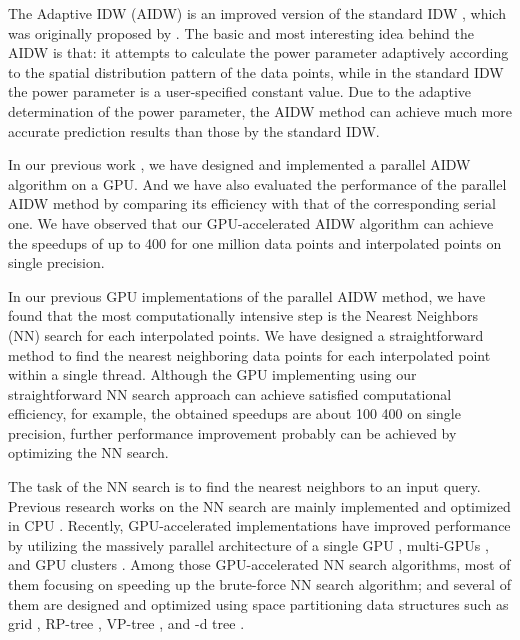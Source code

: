 \documentclass[final,5p,times,twocolumn,authoryear]{elsarticle}
\begin{document}
The Adaptive IDW (AIDW) is an improved version of the standard IDW \citep{01Shepard:1968:TIF:800186.810616}, which was originally proposed by \cite{28DBLP:journals/gandc/LuW08}. 
The basic and most interesting idea behind the AIDW is that: it attempts to 
calculate the power parameter adaptively according to the spatial 
distribution pattern of the data points, while in the standard IDW the power 
parameter is a user-specified constant value. Due to the adaptive 
determination of the power parameter, the AIDW method can achieve much more 
accurate prediction results than those by the standard IDW. 

In our previous work \citep{29DBLP:journals/corr/MeiXX15}, we have designed and implemented a parallel AIDW 
algorithm on a GPU. And we have also evaluated the performance of the 
parallel AIDW method by comparing its efficiency with that of the 
corresponding serial one. We have observed that our GPU-accelerated AIDW 
algorithm can achieve the speedups of up to 400 for one million data points 
and interpolated points on single precision.

In our previous GPU implementations of the parallel AIDW method, we have 
found that the most computationally intensive step is the  Nearest Neighbors 
(NN) search for each interpolated points. We have designed a straightforward 
method to find the  nearest neighboring data points for each interpolated 
point within a single thread. Although the GPU implementing using our 
straightforward NN search approach can achieve satisfied computational 
efficiency, for example, the obtained speedups are about 100  400 on 
single precision, further performance improvement probably can be achieved by 
optimizing the NN search. 

The task of the NN search is to find the nearest neighbors to an input 
query. Previous research works on the NN search are mainly implemented and 
optimized in CPU \citep{n01DBLP:journals/cg/SankaranarayananSV07}. Recently, GPU-accelerated implementations 
have improved performance by utilizing the massively parallel architecture 
of a single GPU \citep{n02DBLP:conf/cvpr/GarciaDB08,n03DBLP:journals/ijpp/LeiteTFRTK12,n04DBLP:conf/icde/PanM12,n05Liang5382329,06DBLP:journals/gandc/HuangY11, n07DBLP:journals/prl/BeliakovL12, n08DBLP:journals/corr/KomarovDD13, n09DBLP:journals/prl/LiuW15}, multi-GPUs \citep{n10DBLP:journals/concurrency/KatoH12,n11arefin2012gpu}, and GPU clusters \citep{n12}. 
Among those GPU-accelerated NN search algorithms, most of them focusing on 
speeding up the brute-force NN search algorithm; and several of them are 
designed and optimized using space partitioning data structures such as grid 
\citep{n03DBLP:journals/ijpp/LeiteTFRTK12}, RP-tree \citep{n04DBLP:conf/icde/PanM12}, VP-tree 
\citep{n09DBLP:journals/prl/LiuW15}, and -d tree \citep{n07DBLP:journals/prl/BeliakovL12}. 
\end{document}

